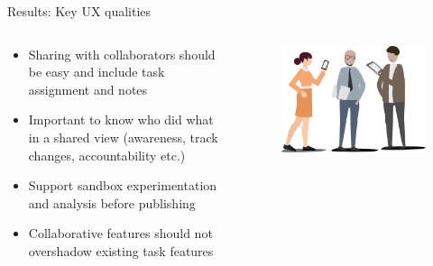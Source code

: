 \documentclass[aspectratio=169]{beamer}
\begin{document}
\begin{frame}{Results: Key UX qualities}
    \begin{columns}
        \begin{column}{0.6\textwidth}
            \small
            \begin{itemize}
                \item Sharing with collaborators should be easy and include task assignment and notes
                \item Important to know who did what in a shared view (awareness, track changes, accountability etc.)
                \item Support sandbox experimentation and analysis before publishing
                \item Collaborative features should not overshadow existing task features
            \end{itemize}
        \end{column}
        \begin{column}{0.4\textwidth}
            \begin{figure}[h]
                \centering
                \includegraphics[width=1\textwidth]{images/Users.png}
            \end{figure}
        \end{column}
    \end{columns}
\end{frame}
\end{document}
